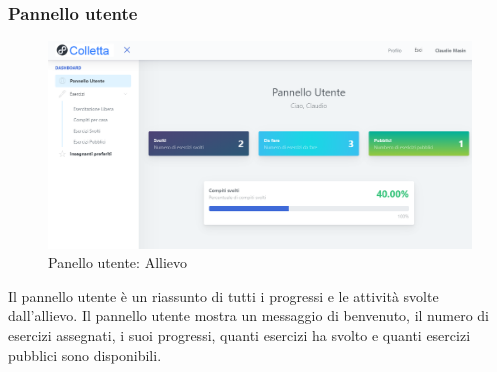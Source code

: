             
        \subsubsection{Pannello utente}
			\begin{figure}[H]
        		\centering
        		\includegraphics[width=1\linewidth]{sez/img/studente/panelloUtente.PNG} 
        		\caption{Panello utente: Allievo}\label{fig:1}
    		\end{figure}        
        
          Il pannello utente è un riassunto di tutti i progressi e le attività svolte dall'allievo. Il pannello utente mostra un messaggio di benvenuto, il numero di esercizi assegnati, i suoi progressi, quanti esercizi ha svolto e quanti esercizi pubblici sono disponibili. 
          

